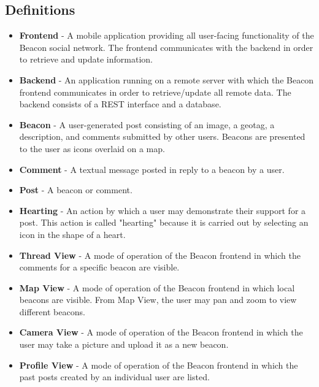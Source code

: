 \subsection{Definitions}
\begin{itemize}
    \item \textbf{Frontend} - A mobile application providing all user-facing
        functionality of the Beacon social network. The frontend communicates
        with the backend in order to retrieve and update information.

    \item \textbf{Backend} - An application running on a remote server with which
        the Beacon frontend communicates in order to retrieve/update all remote
        data. The backend consists of a REST interface and a database.

    \item \textbf{Beacon} - A user-generated post consisting of an image, a geotag,
        a description, and comments submitted by other users. Beacons are presented
        to the user as icons overlaid on a map.

    \item \textbf{Comment} - A textual message posted in reply to a beacon by a user.

    \item \textbf{Post} - A beacon or comment.

    \item \textbf{Hearting} - An action by which a user may demonstrate their support
        for a post. This action is called "hearting" because it is
        carried out by selecting an icon in the shape of a heart.

    \item \textbf{Thread View} - A mode of operation of the Beacon frontend in which
        the comments for a specific beacon are visible.

    \item \textbf{Map View} - A mode of operation of the Beacon frontend in which
        local beacons are visible. From Map View, the user may pan and zoom to view
        different beacons.
        
    \item \textbf{Camera View} - A mode of operation of the Beacon frontend in which
        the user may take a picture and upload it as a new beacon.

    \item \textbf{Profile View} - A mode of operation of the Beacon frontend in which
        the past posts created by an individual user are listed.

\end{itemize}
    
